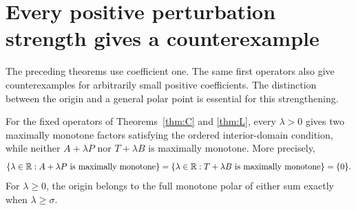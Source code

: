 \section{Every positive perturbation strength gives a counterexample}
\label{sec:parameters}
The preceding theorems use coefficient one. The same first operators
also give counterexamples for arbitrarily small positive coefficients.
The distinction between the origin and a general polar point is essential
for this strengthening.

\begin{proposition}\label{prop:all-strengths}
For the fixed operators of Theorems~\ref{thm:C} and \ref{thm:L}, every
$\lambda>0$ gives two maximally monotone factors satisfying the ordered
interior-domain condition, while neither $A+\lambda P$ nor $T+\lambda B$
is maximally monotone. More precisely,
\[
\{\lambda\in\mathbb R:A+\lambda P\text{ is maximally monotone}\}
=\{\lambda\in\mathbb R:T+\lambda B\text{ is maximally monotone}\}
=\{0\}.
\]
For $\lambda\ge0$, the origin belongs to the full monotone polar of
either sum exactly when $\lambda\ge\sigma$.
\end{proposition}
